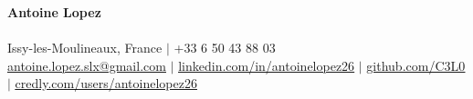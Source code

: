 \documentclass[letterpaper,10pt]{article}
\begin{document}


\begin{center}
    {\Huge \textbf{Antoine Lopez}} \\ \vspace{2pt}
    {\large \textbf{\jobtitle}} \\ \vspace{2pt}
    \small
    Issy-les-Moulineaux, France $|$ +33 6 50 43 88 03 \\
    \href{mailto:antoine.lopez.slx@gmail.com}{\underline{antoine.lopez.slx@gmail.com}} $|$ 
    \href{https://linkedin.com/in/antoinelopez26}{\underline{linkedin.com/in/antoinelopez26}} $|$
    \href{https://github.com/C3L0}{\underline{github.com/C3L0}} $|$
    \href{https://www.credly.com/users/antoinelopez26}{\underline{credly.com/users/antoinelopez26}}
\end{center}

\vspace{-10pt}







\end{document}
